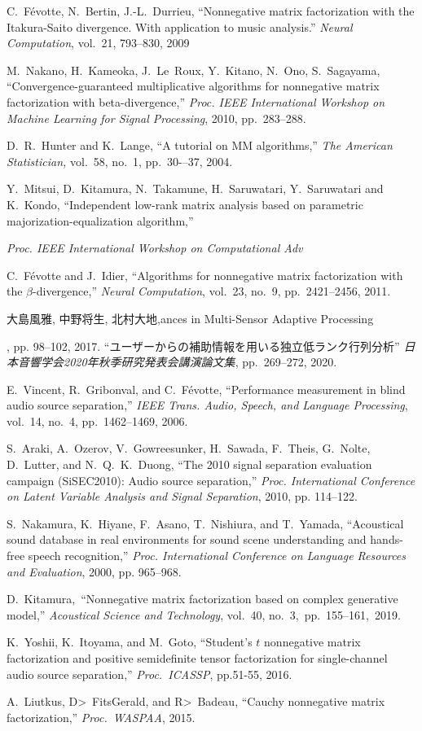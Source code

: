 \documentclass[honka]{nitkagawathesis}%
\begin{document}
\begin{thebibliography}{99}
  C.~Févotte, N.~Bertin, J.-L.~Durrieu, 
  ``Nonnegative matrix factorization with the Itakura-Saito divergence. With application to music analysis.'' 
  {\em Neural Computation}, vol.~21, 793--830, 2009
  
  M.~Nakano, H.~Kameoka, J.~Le~Roux, Y.~Kitano, N.~Ono, S.~Sagayama, ``Convergence-guaranteed multiplicative algorithms for nonnegative matrix factorization with beta-divergence,''
  {\em Proc. IEEE International Workshop on Machine Learning for Signal Processing}, 2010, pp.~283--288.
  
  D.~R.~Hunter and K.~Lange, ``A tutorial on MM algorithms,'' 
  {\em The American Statistician,} vol.~58, no.~1, pp.~30-–37, 2004.
  
  Y.~Mitsui, D.~Kitamura, N.~Takamune, H.~Saruwatari, Y.~Saruwatari and K.~Kondo, ``Independent low-rank matrix analysis based on parametric majorization-equalization algorithm,'' 
  {\em Proc. IEEE International Workshop on Computational Adv  

  C.~Févotte and J.~Idier, 
  ``Algorithms for nonnegative matrix factorization with the $\beta$-divergence,'' 
  {\em Neural Computation}, vol.~23, no.~9, pp.~2421--2456, 2011.

  大島風雅, 中野将生, 北村大地,ances in Multi-Sensor Adaptive Processing}, pp. 98--102, 2017.
``ユーザーからの補助情報を用いる独立低ランク行列分析''
  {\em 日本音響学会2020年秋季研究発表会講演論文集}, pp.~269--272, 2020.    

  E.~Vincent, R.~Gribonval, and C.~F\'evotte, ``Performance measurement in blind audio source separation,'' 
  {\em IEEE Trans. Audio, Speech, and Language Processing}, vol.~14, no.~4, pp.~1462--1469, 2006.
  
  S.~Araki, A.~Ozerov, V.~Gowreesunker, H.~Sawada, F.~Theis, G.~Nolte, D.~Lutter, and N.~Q.~K.~Duong, 
  ``The 2010 signal separation evaluation campaign (SiSEC2010): Audio source separation,'' 
  {\em Proc. International Conference on Latent Variable Analysis and Signal Separation}, 2010, pp. 114–122.
  
  S.~Nakamura, K.~Hiyane, F.~Asano, T.~Nishiura, and T.~Yamada, 
  ``Acoustical sound database in real environments for sound scene understanding and hands-free speech recognition,'' 
  {\em Proc. International Conference on Language Resources and Evaluation}, 2000, pp. 965–968.

  D.~Kitamura,~``Nonnegative matrix factorization based on complex generative model,''
  {\em Acoustical Science and Technology}, vol.~40, no.~3,~pp.~155--161,~2019.

  K.~Yoshii, K.~Itoyama, and M.~Goto, ``Student's $t$ nonnegative matrix factorization and positive semidefinite tensor    
  factorization for single-channel audio source separation,''
  {\em Proc.~ICASSP}, pp.51-55, 2016.

  A.~Liutkus, D>~FitsGerald, and R>~Badeau, ``Cauchy nonnegative matrix factorization,''
  {\em Proc.~WASPAA}, 2015.

\end{thebibliography}
\end{document}
